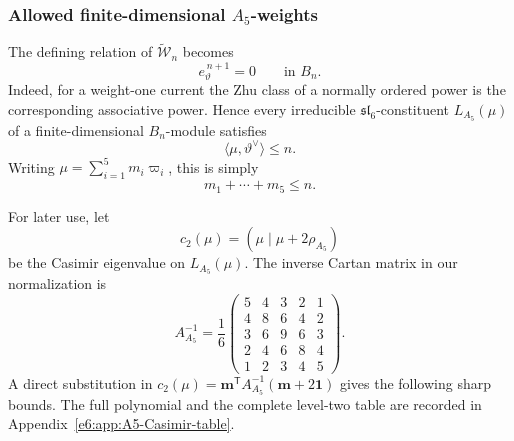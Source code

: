\documentclass[11pt,reqno]{amsart}
\theoremstyle{definition}
\theoremstyle{remark}
\begin{document}
\subsubsection{Allowed finite-dimensional \texorpdfstring{$A_5$}{A5}-weights}


The defining relation of $\widetilde{\mathcal W}_n$ becomes
\begin{equation*}
  e_\vartheta^{\,n+1}=0
  \qquad\text{in }B_n.
\end{equation*}
Indeed, for a weight-one current the Zhu class of a normally ordered power is
the corresponding associative power.  Hence every irreducible
$\mathfrak{sl}_6$-constituent $L_{A_5}(\mu)$ of a finite-dimensional
$B_n$-module satisfies
\begin{equation*}
  \langle\mu,\vartheta^\vee\rangle\le n.
\end{equation*}
Writing $\mu=\sum_{i=1}^{5}m_i\varpi_i$, this is simply
\begin{equation*}
  m_1+\cdots+m_5\le n.
\end{equation*}

For later use, let
\begin{equation*}
  c_2(\mu)=(\mu\mid\mu+2\rho_{A_5})
\end{equation*}
be the Casimir eigenvalue on $L_{A_5}(\mu)$.  The inverse Cartan matrix in our
normalization is
\begin{equation}\label{e6:eq:A5-inverse-Cartan}
  A_{A_5}^{-1}
  =\frac16
  \begin{pmatrix}
    5&4&3&2&1\\
    4&8&6&4&2\\
    3&6&9&6&3\\
    2&4&6&8&4\\
    1&2&3&4&5
  \end{pmatrix}.
\end{equation}
A direct substitution in
$c_2(\mu)=\boldsymbol m^{\mathsf T}A_{A_5}^{-1}
(\boldsymbol m+2\boldsymbol 1)$ gives the following sharp bounds.  The full
polynomial and the complete level-two table are recorded in
Appendix~\ref{e6:app:A5-Casimir-table}.
\end{document}
